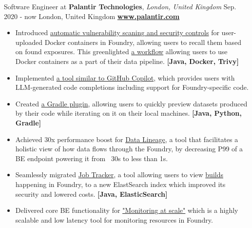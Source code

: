 \cveventflat
{Software Engineer at }
{\textbf{Palantir Technologies}, \textit{London, United Kingdom}}
{Sep. 2020 - now}
{London, United Kingdom}
\newline
\href{https://www.palantir.com/}{\textbf{www.palantir.com}}
\begin{itemize}
    \item {
        Introduced
        \href{https://www.palantir.com/docs/foundry/administration/container-governance/}{automatic vulnerability scaning and security controls}
        for user-uploaded Docker containers in Foundry, allowing users to recall them based on found exposures.
        This greenlighted
        \href{https://www.palantir.com/docs/foundry/transforms-python/container-overview/}{a workflow}
        allowing users to use Docker containers as a part of their data pipeline.
    }
    \textbf{[Java, Docker, Trivy]}
    \item {
        Implemented
        \href{https://www.palantir.com/docs/foundry/code-repositories/aip-features/#code-autocomplete}{a tool similar to GitHub Copilot},
        which provides users with LLM-generated code completions including support for Foundry-specific code.
    }
    \item {
        Created
        \href{https://www.palantir.com/docs/foundry/transforms-common/local-preview/}{a Gradle plugin},
        allowing users to quickly preview datasets produced by their code while iterating on it on their local machines.
    }
    \textbf{[Java, Python, Gradle]}
    \item {
        Achieved 30x performance boost for
        \href{https://www.palantir.com/docs/foundry/data-lineage/overview/}{Data Lineage},
        a tool that facilitates a holistic view of how data flows through the Foundry,
        by decreasing P99 of a BE endpoint powering it from ~30s to less than 1s.
    }
    \item {
        Seamlessly migrated
        \href{https://www.palantir.com/docs/foundry/data-integration/application-reference/#builds}{Job Tracker},
        a tool allowing users to view
        \href{https://www.palantir.com/docs/foundry/data-integration/builds/}{builds}
        happening in Foundry, to a new ElastSearch index which improved its security and lowered costs.
    }
    \textbf{[Java, ElasticSearch]}
    \item {
        Delivered core BE functionality for
        \href{https://www.palantir.com/docs/foundry/maintaining-pipelines/monitoring-views-intro/}{"Monitoring at scale"}
        which is a highly scalable and low latency tool for monitoring resources in Foundry.
}
\end{itemize}
